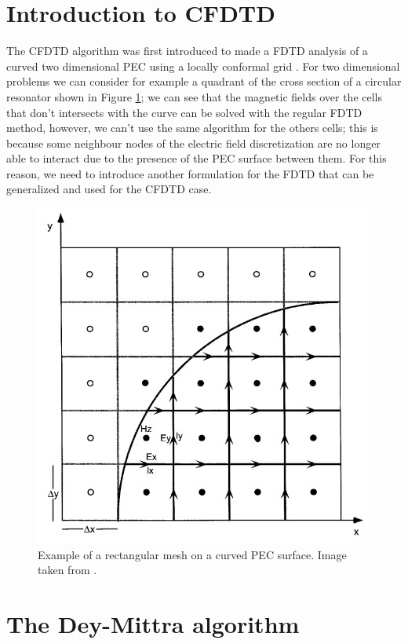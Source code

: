 \documentclass[12pt, oneside]{book}
\begin{document}
\section{Introduction to CFDTD}

The CFDTD algorithm was first introduced to made a FDTD analysis of a curved two dimensional PEC using a locally conformal grid \cite{DeyMittra1997}. For two dimensional problems we can consider for example a quadrant of the cross section of a circular resonator shown in Figure \ref{fig:DeyMittraMesh}; we can see that the magnetic fields over the cells that don't intersects with the curve can be solved with the regular FDTD method, however, we can't use the same algorithm for the others cells; this is because some neighbour nodes of the electric field discretization are no longer able to interact due to the presence of the PEC surface between them. For this reason, we need to introduce another formulation for the FDTD that can be generalized and used for the CFDTD case.

\begin{figure}[h]
    \centering
    \includegraphics[scale=1.0]{Imagenes/DeyMittra_2DMeshExample.jpg}
    \caption{Example of a rectangular mesh on a curved PEC surface. Image taken from \cite{Dey1997ALC}.}
    \label{fig:DeyMittraMesh}
\end{figure}

\section{The Dey-Mittra algorithm}
\end{document}
